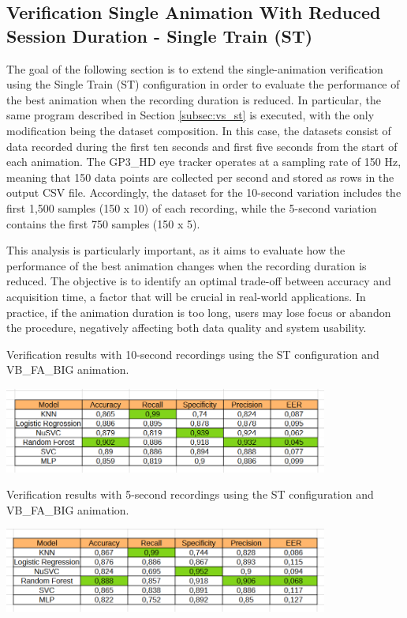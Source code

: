 \documentclass[12pt]{report}
\begin{document}
\subsection{Verification Single Animation With Reduced Session Duration - Single Train (ST)}

The goal of the following section is to extend the single-animation verification using the Single Train (ST) configuration in order to evaluate the performance of the best animation when the recording duration is reduced.
In particular, the same program described in Section \ref{subsec:vs_st} is executed, with the only modification being the dataset composition.
In this case, the datasets consist of data recorded during the first ten seconds and first five seconds from the start of each animation.
The GP3\_HD eye tracker operates at a sampling rate of 150 Hz, meaning that 150 data points are collected per second and stored as rows in the output CSV file.
Accordingly, the dataset for the 10-second variation includes the first 1,500 samples (150 x 10) of each recording, while the 5-second variation contains the first 750 samples (150 x 5).

This analysis is particularly important, as it aims to evaluate how the performance of the best animation changes when the recording duration is reduced.
The objective is to identify an optimal trade-off between accuracy and acquisition time, a factor that will be crucial in real-world applications.
In practice, if the animation duration is too long, users may lose focus or abandon the procedure, negatively affecting both data quality and system usability.

\begin{table}[ht]
    \centering
    \caption{Verification results with 10-second recordings using the ST configuration and VB\_FA\_BIG animation.}
    \includegraphics[width=0.8\textwidth]{Images/Results/Verification_single_five_ten/st/ten/VB_FA_BIG.png}
    \label{tab:VB_FA_BIG_10_st}
\end{table}

\begin{table}[ht]
    \centering
    \caption{Verification results with 5-second recordings using the ST configuration and VB\_FA\_BIG animation.}
    \includegraphics[width=0.8\textwidth]{Images/Results/Verification_single_five_ten/st/five/VB_FA_BIG.png}
    \label{tab:VB_FA_BIG_5_st}
\end{table}
\end{document}
